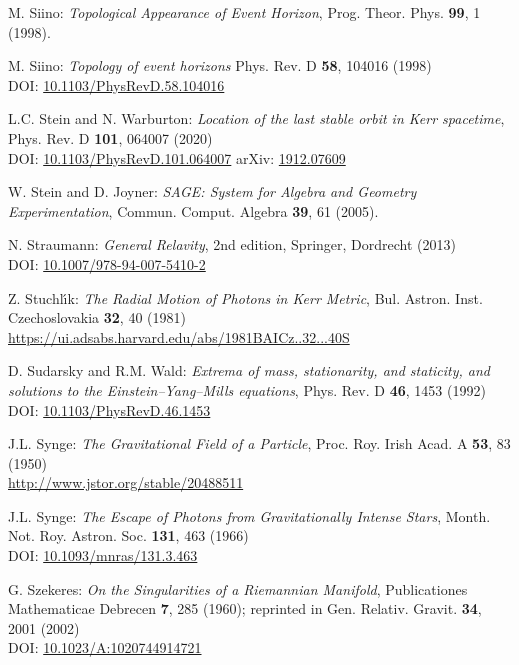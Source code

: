 \begin{thebibliography}{123}
M. Siino: {\em Topological Appearance of Event Horizon},
Prog. Theor. Phys. {\bf 99}, 1 (1998).

M. Siino: {\em Topology of event horizons}
Phys. Rev. D {\bf 58}, 104016 (1998)\\
DOI: \href{https://doi.org/10.1103/PhysRevD.58.104016}{10.1103/PhysRevD.58.104016}

L.C. Stein and N. Warburton:
{\em Location of the last stable orbit in Kerr spacetime},
Phys. Rev. D  {\bf 101}, 064007 (2020)\\
DOI: \href{https://doi.org/10.1103/PhysRevD.101.064007}{10.1103/PhysRevD.101.064007}\hfill
arXiv: \href{https://arxiv.org/abs/1912.07609}{1912.07609}

W. Stein and D. Joyner: {\em SAGE: System for Algebra and Geometry Experimentation},
Commun. Comput. Algebra {\bf 39}, 61 (2005).

N. Straumann: \emph{General Relavity}, 2nd edition,
Springer, Dordrecht (2013)\\
DOI: \href{https://doi.org/10.1007/978-94-007-5410-2}{10.1007/978-94-007-5410-2}

Z. Stuchl\'{\i}k: {\em The Radial Motion of Photons in Kerr Metric},
Bul. Astron. Inst. Czechoslovakia {\bf 32}, 40 (1981)\\
\url{https://ui.adsabs.harvard.edu/abs/1981BAICz..32...40S}

D. Sudarsky and R.M. Wald: {\em Extrema of mass, stationarity, and staticity,
and solutions to the Einstein–Yang–Mills equations},
Phys. Rev. D {\bf 46}, 1453 (1992)\\
DOI: \href{https://doi.org/10.1103/PhysRevD.46.1453}{10.1103/PhysRevD.46.1453}

J.L. Synge: {\em The Gravitational Field of a Particle},
Proc. Roy. Irish Acad. A {\bf 53}, 83 (1950)\\
\url{http://www.jstor.org/stable/20488511}

J.L. Synge: {\em The Escape of Photons from Gravitationally Intense Stars},
Month. Not. Roy. Astron. Soc. {\bf 131}, 463 (1966)\\
DOI: \href{https://doi.org/10.1093/mnras/131.3.463}{10.1093/mnras/131.3.463}

G. Szekeres: {\em On the Singularities of a Riemannian Manifold},
Publicationes Mathematicae Debrecen {\bf 7}, 285 (1960); reprinted in
Gen. Relativ. Gravit. {\bf 34}, 2001 (2002)\\
DOI: \href{https://doi.org/10.1023/A:1020744914721}{10.1023/A:1020744914721}


\end{thebibliography}
